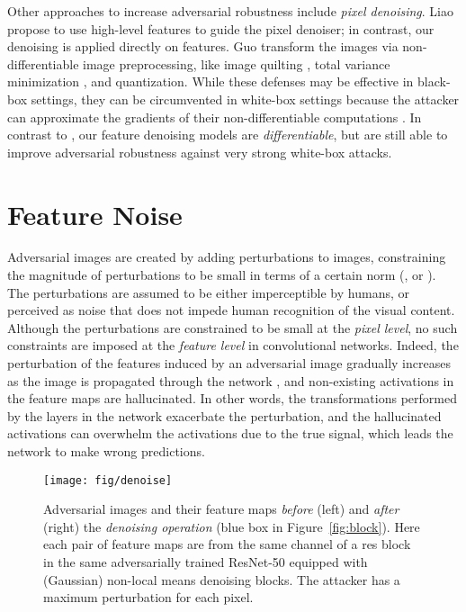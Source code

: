 \documentclass[10pt,twocolumn,letterpaper]{article}
\begin{document}
Other approaches to increase adversarial robustness include \emph{pixel denoising}. Liao \etal \cite{Liao2018} propose to use high-level features to guide the pixel denoiser; in contrast, our denoising is applied directly on features.
Guo \etal \cite{Guo2018} transform the images via non-differentiable image preprocessing, like image quilting \cite{Efros2001}, total variance minimization \cite{Rudin1992}, and quantization. While these defenses may be effective in black-box settings, they can be circumvented in white-box settings because the attacker can approximate the gradients of their non-differentiable computations \cite{Athalye2018}. In contrast to \cite{Guo2018}, our feature denoising models are \emph{differentiable}, but are still able to improve adversarial robustness against very strong white-box attacks.

\section{Feature Noise}\label{sec:noise}
Adversarial images are created by adding perturbations to images, constraining the magnitude of perturbations to be small in terms of a certain norm (\eg,  or ).
The perturbations are assumed to be either imperceptible by humans, or perceived as noise that does not impede human recognition of the visual content. Although the perturbations are constrained to be small at the \emph{pixel level}, no such constraints are imposed at the \emph{feature level} in convolutional networks. Indeed, the perturbation of the features induced by an adversarial image gradually increases as the image is propagated through the network \cite{Liao2018, Guo2018}, and non-existing activations in the feature maps are hallucinated. In other words, the transformations performed by the layers in the network exacerbate the perturbation, and the hallucinated activations can overwhelm the activations due to the true signal, which leads the network to make wrong predictions.

\begin{figure}[t]
\centering
\vspace{-.5em}
\texttt{[image: fig/denoise]}
\vspace{-1.5em}
\caption{Adversarial images and their feature maps \emph{before} (left) and \emph{after} (right) the \emph{denoising operation} (blue box in Figure~\ref{fig:block}).
Here each pair of feature maps are from the same channel of a res block in the same adversarially trained ResNet-50 equipped with (Gaussian) non-local means denoising blocks. The attacker has a maximum perturbation  for each pixel.}
\label{fig:denoise}
\vspace{-1em}
\end{figure}
\end{document}

